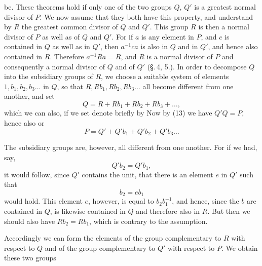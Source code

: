 be. These theorems hold if only one of the two groups $Q$, $Q'$
is a greatest normal divisor of $P$. We now assume that they
both have this property, and understand by $R$ the greatest
common divisor of $Q$ and $Q'$. This group $R$ is then a normal
divisor of $P$ as well as of $Q$ and $Q'$. For if $a$ is any
element in $P$, and $c$ is contained in $Q$ as well as in $Q'$,
then $a^{-1}ca$ is also in $Q$ and in $Q'$, and hence also
contained in $R$. Therefore $a^{-1}Ra = R$, and $R$ is a normal
divisor of $P$ and consequently a normal divisor of $Q$ and of $Q'$
(\S.\,4, 5.). In order to decompose $Q$ into the subsidiary groups
of $R$, we choose a suitable system of elements $1, b_1, b_2, b_3 \ldots$
in $Q$, so that $R, Rb_1, Rb_2, Rb_3 \ldots$ all become different
from one another, and set
\[
Q = R + Rb_1 + Rb_2 + Rb_3 + \ldots,
\]
which we can also, if we set
denote briefly by
Now by (13) we have $Q'Q = P$, hence also
or
\[
P = Q' + Q'b_1 + Q'b_2 + Q'b_3 \ldots
\]

The subsidiary groups
are, however, all different from one another. For if we had, say,
\[
Q'b_2 = Q'b_1,
\]
it would follow, since $Q'$ contains the unit, that there is an element
$e$ in $Q'$ such that
\[
b_2 = eb_1
\]
would hold. This element $e$, however, is equal to $b_2b_1^{-1}$, and
hence, since the $b$ are contained in $Q$, is likewise contained in $Q$
and therefore also in $R$. But then we should also have $Rb_2 = Rb_1$,
which is contrary to the assumption.

Accordingly we can form the elements of the group complementary to $R$
with respect to $Q$ and of the group complementary to $Q'$ with respect
to $P$. We obtain these two groups
